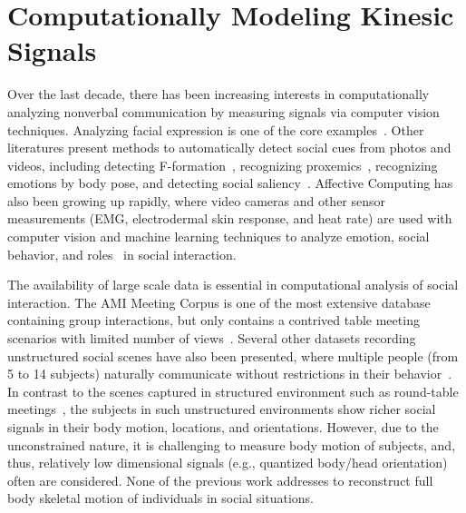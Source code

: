 \section{Computationally Modeling Kinesic Signals}
Over the last decade, there has been increasing interests in computationally analyzing nonverbal communication by measuring signals via computer vision techniques.  Analyzing facial expression is one of the core examples~\cite{ChuDC13, Torre15, shan2009facial}. Other literatures present methods to automatically detect social cues from photos and videos, including detecting F-formation~\cite{setti2015f}, recognizing proxemics~\cite{yang2012recognizing}, recognizing emotions by body pose\cite{schindler2008recognizing}, and detecting social saliency~\cite{park20123d}. Affective Computing has also been growing up rapidly, where video cameras and other sensor measurements (EMG, electrodermal skin response, and heat rate) are used with computer vision and machine learning techniques to analyze emotion, social behavior, and roles~\cite{picard1997affective} in social interaction. 

The availability of large scale data is essential in computational analysis of social interaction. The AMI Meeting Corpus is one of the most extensive database containing group interactions, but only contains a contrived table meeting scenarios with limited number of views~\cite{carletta2005ami}. Several other datasets recording unstructured social scenes have also been presented, where multiple people (from 5 to 14 subjects) naturally communicate without restrictions in their behavior~\cite{Zen-10,Cristani-11,SALSA-15}. In contrast to the scenes captured in structured environment such as round-table meetings~\cite{carletta2005ami, Lepri-12}, the subjects in such unstructured environments show richer social signals in their body motion, locations, and orientations. However, due to the unconstrained nature, it is challenging to measure body motion of subjects, and, thus, relatively low dimensional signals (e.g., quantized body/head orientation) often are considered. None of the previous work addresses to reconstruct full body skeletal motion of individuals in social situations. %
%


